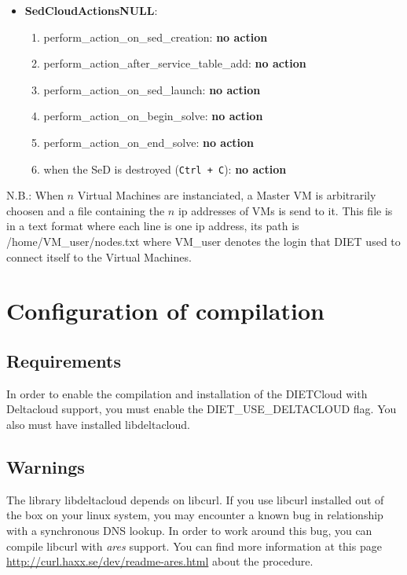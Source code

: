 \begin{itemize}
  \item \textbf{SedCloudActionsNULL}:
    \begin{enumerate}
        \item perform\_action\_on\_sed\_creation: \textbf{no action}
        \item perform\_action\_after\_service\_table\_add: \textbf{no action}
        \item perform\_action\_on\_sed\_launch: \textbf{no action}
        \item perform\_action\_on\_begin\_solve: \textbf{no action}
        \item perform\_action\_on\_end\_solve: \textbf{no action}
        \item when the SeD is destroyed (\texttt{Ctrl + C}): \textbf{no action}
   \end{enumerate}
\end{itemize}

N.B.: When $n$ Virtual Machines are instanciated, a Master VM is
arbitrarily choosen and a file containing the $n$ ip addresses of VMs
is send to it. This file is in a text format where each line is one ip
address, its path is /home/VM\_user/nodes.txt where VM\_user denotes
the login that DIET used to connect itself to the Virtual Machines.



\section{Configuration of compilation}

\subsection{Requirements}

In order to enable the compilation and installation of the DIETCloud
with Deltacloud support, you must enable the DIET\_USE\_DELTACLOUD
flag. You also must have installed libdeltacloud.

\subsection{Warnings}

The library libdeltacloud depends on libcurl. If you use libcurl
installed out of the box on your linux system, you may encounter a known bug
in relationship with a synchronous DNS lookup. In order to work around
this bug, you can compile libcurl with \emph{ares} support. You can find more
information at this page
\url{http://curl.haxx.se/dev/readme-ares.html} about the procedure.

